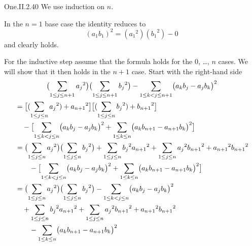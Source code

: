 \begin{ans}{One.II.2.40}
       We use induction on \( n \).

       In the \( n=1 \) base case the identity reduces to
       \begin{equation*}
          (a_1b_1)^2=({a_1}^2)({b_1}^2)-0
       \end{equation*}
       and clearly holds.

       For the inductive step assume that
       the formula holds for the \( 0 \), \ldots, \( n \) cases.
       We will show that it then holds in the \( n+1 \) case.
       Start with the right-hand side
       \begin{multline*}
         \bigl( \sum_{1\leq j\leq n+1}{a_j}^2\bigr)
         \bigl( \sum_{1\leq j\leq n+1}{b_j}^2\bigr)
         -
         \sum_{1\leq k<j\leq n+1}\bigl(a_kb_j-a_jb_k\bigr)^2  \\
       \begin{aligned}
         &=
         \bigl[ (\sum_{1\leq j\leq n}{a_j}^2)+{a_{n+1}}^2\bigr]
         \bigl[ (\sum_{1\leq j\leq n}{b_j}^2)+{b_{n+1}}^2\bigr]   \\
         &\hbox{}\quad -
         \bigl[\sum_{1\leq k<j\leq n}\bigl(a_kb_j-a_jb_k\bigr)^2+
         \sum_{1\leq k\leq n}\bigl(a_kb_{n+1}-a_{n+1}b_k\bigr)^2  \bigr] \\
         &=
         \bigl( \sum_{1\leq j\leq n}{a_j}^2\bigr)
         \bigl( \sum_{1\leq j\leq n}{b_j}^2\bigr)
         +
         \sum_{1\leq j\leq n}{b_j}^2{a_{n+1}}^2
         +
         \sum_{1\leq j\leq n}{a_j}^2{b_{n+1}}^2
         +
         {a_{n+1}}^2{b_{n+1}}^2                                 \\
         &\hbox{}\qquad\hbox{} -
         \bigl[\sum_{1\leq k<j\leq n}\bigl(a_kb_j-a_jb_k\bigr)^2+
         \sum_{1\leq k\leq n}\bigl(a_kb_{n+1}-a_{n+1}b_k\bigr)^2  \bigr] \\
         &=
         \bigl( \sum_{1\leq j\leq n}{a_j}^2\bigr)
         \bigl( \sum_{1\leq j\leq n}{b_j}^2\bigr)
         -\sum_{1\leq k<j\leq n}\bigl(a_kb_j-a_jb_k\bigr)^2   \\
         &\hbox{}\quad +
         \sum_{1\leq j\leq n}{b_j}^2{a_{n+1}}^2
         +
         \sum_{1\leq j\leq n}{a_j}^2{b_{n+1}}^2
         +
         {a_{n+1}}^2{b_{n+1}}^2                                 \\
         &\hbox{}\qquad\hbox{} -
         \sum_{1\leq k\leq n}\bigl(a_kb_{n+1}-a_{n+1}b_k\bigr)^2
        \end{aligned}
       \end{multline*}

\end{ans}
